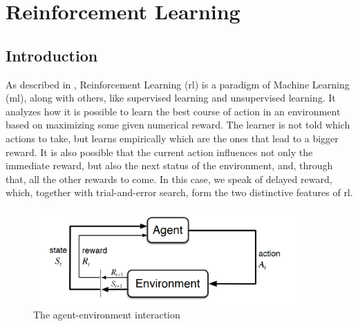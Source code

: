 \chapter{Reinforcement Learning} %
\label{chap:RL}


\section{Introduction}


As described in \cite{SuttonBarto}, Reinforcement Learning (\acrshort{rl}) is a paradigm of Machine Learning (\acrshort{ml}), along with others, like supervised learning and unsupervised learning. It analyzes how it is possible to learn the best course of action in an environment based on maximizing some given numerical reward. The learner is not told which actions to take, but learns empirically which are the ones that lead to a bigger reward. It is also possible that the current action influences not only the immediate reward, but also the next status of the environment, and, through that, all the other rewards to come. In this case, we speak of delayed reward, which, together with trial-and-error search, form the two distinctive features of \acrshort{rl}.

\begin{figure}[!ht]
    \centering
    \includegraphics[width=0.9\textwidth]{chapters/figures/MDP-diagram.png}
    \caption{The agent-environment interaction \cite{SuttonBarto}}
    \label{fig:MDP}
\end{figure}

